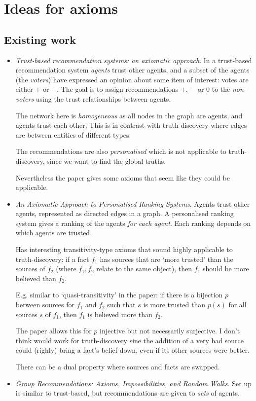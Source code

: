 \documentclass{article}
\theoremstyle{definition}
\theoremstyle{plain}
\theoremstyle{remark}
\begin{document}
\section{Ideas for axioms}

\subsection{Existing work}

\begin{itemize}

\item \emph{Trust-based recommendation systems: an axiomatic
approach}{\cite{andersen}}. In a trust-based recommendation system
\emph{agents} trust other agents, and a subset of the agents (the
\emph{voters}) have expressed an opinion about some item of interest: votes are
either $+$ or $-$. The goal is to assign recommendations $+$, $-$ or $0$ to the
\emph{non-voters} using the trust relationships between agents.

The network here is \emph{homogeneous} as all nodes in the graph are agents,
and agents trust each other. This is in contrast with truth-discovery where
edges are between entities of different types.

The recommendations are also \emph{personalised} which is not applicable to
truth-discovery, since we want to find the global truths.

Nevertheless the paper gives some axioms that seem like they could be
applicable.

\item \emph{An Axiomatic Approach to Personalised Ranking
Systems}{\cite{altman_personalised}}. Agents trust other agents, represented as
directed edges in a graph. A personalised ranking system gives a ranking of the
agents \emph{for each agent}. Each ranking depends on which agents are trusted.

Has interesting transitivity-type axioms that sound highly applicable to
truth-discovery: if a fact $f_1$ has sources that are `more trusted' than the
sources of $f_2$ (where $f_1, f_2$ relate to the same object), then $f_1$
should be more believed than $f_2$.

E.g. similar to `quasi-transitivity' in the paper: if there is a bijection $p$
between sources for $f_1$ and $f_2$ such that $s$ is more trusted than $p(s)$
for all sources $s$ of $f_1$, then $f_1$ is believed more than $f_2$.

The paper allows this for $p$ injective but not necessarily surjective. I don't
think would work for truth-discovery sine the addition of a very bad source
could (righly) bring a fact's belief down, even if its other sources were
better.

There can be a dual property where sources and facts are swapped.

\item \emph{Group Recommendations: Axioms, Impossibilities, and Random
Walks}{\cite{lev}}. Set up is similar to trust-based, but recommendations are
given to \emph{sets} of agents.

\end{itemize}
\end{document}
